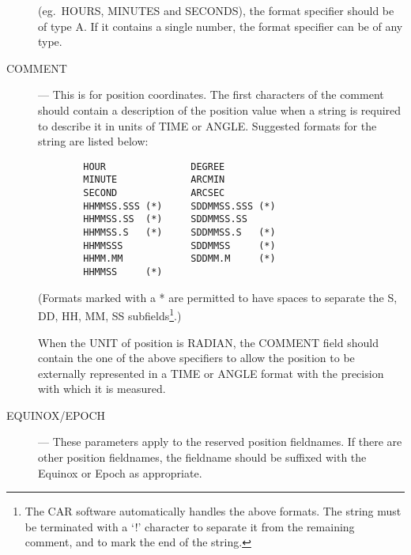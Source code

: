 \begin{description}
(eg.\ HOURS, MINUTES and SECONDS), the format specifier should be of type A.
If it contains a single number, the format specifier can be of any type.
\item[COMMENT] ---
This is for position coordinates.
The first characters of the comment should contain a description of the position
value when a string is required to describe it in units of TIME or ANGLE.
Suggested formats for the string are listed below:
\begin{verbatim}
        HOUR               DEGREE
        MINUTE             ARCMIN
        SECOND             ARCSEC
        HHMMSS.SSS (*)     SDDMMSS.SSS (*)
        HHMMSS.SS  (*)     SDDMMSS.SS
        HHMMSS.S   (*)     SDDMMSS.S   (*)
        HHMMSSS            SDDMMSS     (*)
        HHMM.MM            SDDMM.M     (*)
        HHMMSS     (*)
\end{verbatim}
(Formats marked with a * are permitted to have spaces to separate the S, DD,
HH, MM, SS subfields\footnote
{The CAR software automatically handles the above formats.
The string must be terminated with a `!' character to separate it from the
remaining comment, and to mark the end of the string.}.)

When the UNIT of position is RADIAN, the COMMENT field should contain the one
of the above specifiers to allow the position to be externally represented in a
TIME or ANGLE format with the precision with which it is measured.
\item [EQUINOX/EPOCH] ---
These parameters apply to the reserved position fieldnames.
If there are other position fieldnames, the fieldname should be suffixed with
the Equinox or Epoch as appropriate.
\end{description}
